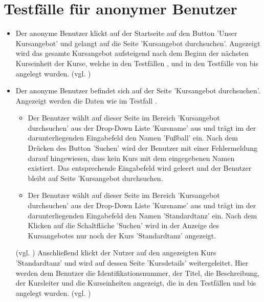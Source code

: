 \documentclass[a4paper]{scrreprt}
\newcounter{Lc}
\newcounter{Hc}
\newcommand{\stepHc}{\stepcounter{Hc}\setcounter{Lc}{0}}
\begin{document}
	\section{Testfälle für anonymer Benutzer}
			\stepHc
			\begin{itemize}
				\item {} 
				 Der anonyme Benutzer klickt auf der Startseite auf den Button 'Unser Kursangebot' und gelangt auf die Seite 'Kursangebot durchsuchen'. Angezeigt wird das gesamte Kursangebot aufsteigend nach dem Beginn der nächsten Kurseinheit der Kurse, welche in den Testfällen ,  und in den Testfälle von  bis  angelegt wurden. (vgl. ) 
				 
				 \item {} 
				 Der anonyme Benutzer befindet sich auf der Seite 'Kursangebot durchsuchen'. Angezeigt werden die Daten wie im Testfall . 
					 \begin{itemize}
					 \item Der Benutzer wählt auf dieser Seite im Bereich 'Kursangebot durchsuchen' aus der Drop-Down Liste 'Kursname' aus und trägt im der darunterliegenden Eingabefeld den Namen 'Fußball' ein. Nach dem Drücken des Button 'Suchen' wird der Benutzer mit einer Fehlermeldung darauf hingewiesen, dass kein Kurs mit dem eingegebenen Namen existiert. Das entsprechende Eingabefeld wird geleert und der Benutzer bleibt auf Seite 'Kursangebot durchsuchen.
					 \item  Der Benutzer wählt auf dieser Seite im Bereich 'Kursangebot durchsuchen' aus der Drop-Down Liste 'Kursname' aus und trägt im der darunterliegenden Eingabefeld den Namen 'Standardtanz' ein. Nach dem Klicken auf die Schaltfläche 'Suchen' wird in der Anzeige des Kursangebotes nur noch der Kurs 'Standardtanz' angezeigt.
					\end{itemize}
				(vgl. )	
				Anschließend klickt der Nutzer auf den angezeigten Kurs 'Standardtanz' und wird auf dessen Seite 'Kursdetails' weitergeleitet. Hier werden dem Benutzer die Identifikationsnummer, der Titel, die Beschreibung, der Kursleiter und die Kurseinheiten angezeigt, die in den Testfällen  und  bis  angelegt wurden. (vgl. ) 
				

\end{itemize}
\end{document}

